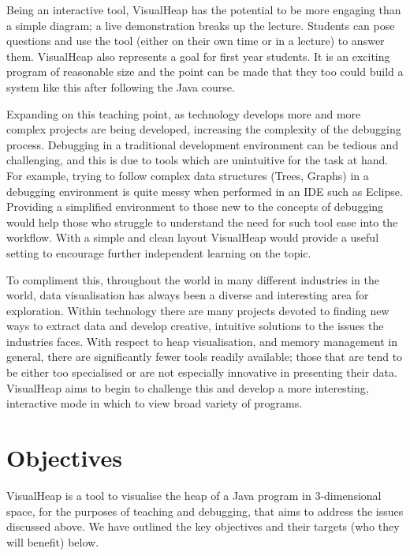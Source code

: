 \documentclass[11pt, a4paper]{report}
\begin{document}
Being an interactive tool, VisualHeap has the potential to be more engaging than a simple diagram; a live demonstration breaks up the lecture. Students can pose questions and use the tool (either on their own time or in a lecture) to answer them. VisualHeap also represents a goal for first year students. It is an exciting program of reasonable size and the point can be made that they too could build a system like this after following the Java course.

Expanding on this teaching point, as technology develops more and more complex projects are being developed, increasing the complexity of the debugging process. Debugging in a traditional development environment can be tedious and challenging, and this is due to tools which are unintuitive for the task at hand. For example, trying to follow complex data structures (Trees, Graphs) in a debugging environment is quite messy when performed in an IDE such as Eclipse. Providing a simplified environment to those new to the concepts of debugging would help those who struggle to understand the need for such tool ease into the workflow. With a simple and clean layout VisualHeap would provide a useful setting to encourage further independent learning on the topic. 

To compliment this, throughout the world in many different industries in the world, data visualisation has always been a diverse and interesting area for exploration. Within technology there are many projects devoted to finding new ways to extract data and develop creative, intuitive solutions to the issues the industries faces. With respect to heap visualisation, and memory management in general, there are significantly fewer tools readily available; those that are tend to be either too specialised or are not especially innovative in presenting their data. VisualHeap aims to begin to challenge this and develop a more interesting, interactive mode in which to view broad variety of programs.

\section{Objectives}

VisualHeap is a tool to visualise the heap of a Java program in 3-dimensional space, for the purposes of teaching and debugging, that aims to address the issues discussed above. We have  outlined the key objectives and their targets (who they will benefit) below.
\end{document}
